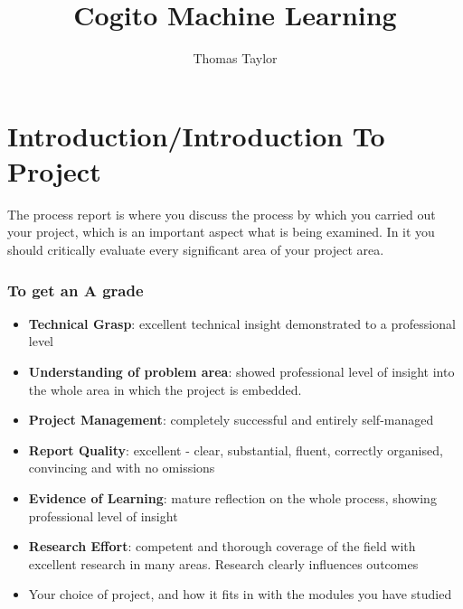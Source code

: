 \documentclass[runningheads,a4paper]{llncs}
\begin{document}
%
%

\title{Cogito Machine Learning}
\titlerunning{}
\author{Thomas Taylor\\ \mail}


%
%

\setcounter{tocdepth}{3}
\tableofcontents
\newpage

%
%


\section{Introduction/Introduction To Project}

The process report is where you discuss the process by which you carried out your project, which is an important aspect what is being examined. In it you should critically evaluate every significant area of your project area.

\subsubsection{To get an A grade}
\begin{itemize}
	\item \textbf{Technical Grasp}: excellent technical insight demonstrated to a professional level
	\item \textbf{Understanding of problem area}: showed professional level of insight into the whole area in which the project is embedded. 
	\item \textbf{Project Management}: completely successful and entirely self-managed
	\item \textbf{Report Quality}: excellent - clear, substantial, fluent, correctly organised, convincing and with no omissions
	\item \textbf{Evidence of Learning}: mature reflection on the whole process, showing professional level of insight
	\item \textbf{Research Effort}: competent and thorough coverage of the field with excellent research in many areas. Research clearly influences outcomes   
	\item Your choice of project, and how it fits in with the modules you have studied
\end{itemize}
\end{document}
